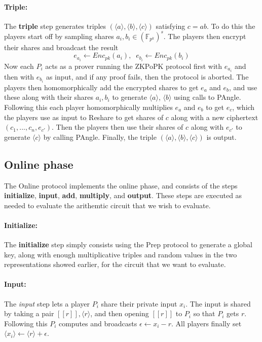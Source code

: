 \documentclass{article}
\begin{document}
\paragraph{Triple:}
The \textbf{triple} step generates triples $(\langle a \rangle, \langle b \rangle, \langle c \rangle)$ satisfying $c = ab$. To do this the players start off by sampling shares $a_i, b_i \in (\mathbb{F}_{p^k})^s$.
The players then encrypt their shares and broadcast the result $$e_{a_i} \leftarrow Enc_{pk}(a_i), \;\; e_{b_i} \leftarrow Enc_{pk}(b_i)$$
Now each $P_i$ acts as a prover running the ZKPoPK protocol first with $e_{a_i}$ and then with $e_{b_i}$ as input, and if any proof fails, then the protocol is aborted.
The players then homomorphically add the encrypted shares to get $e_a$ and $e_b$, and use these along with their shares $a_i, b_i$ to generate $\langle a \rangle$, $\langle b \rangle$ using calls to PAngle.
Following this each player homomorphically multiplies $e_a$ and $e_b$ to get $e_c$, which the players use as input to Reshare to get shares of $c$ along with a new ciphertext $(c_1, ..., c_n, e_{c'})$. Then the players then use their shares of $c$ along with $e_{c'}$ to generate $\langle c \rangle$ by calling PAngle. Finally, the triple $(\langle a \rangle, \langle b \rangle, \langle c \rangle)$ is output.


\subsection{Online phase} \label{subsection: Online}
The Online protocol implements the online phase, 
and consists of the steps \textbf{initialize}, \textbf{input}, \textbf{add}, \textbf{multiply}, and \textbf{output}. These steps are executed as needed to evaluate the arithemtic circuit that we wish to evaluate.

\paragraph{Initialize:} The \textbf{initialize} step simply consists using the Prep protocol to generate a global key, along with enough multiplicative triples and random values in the two representations showed earlier, for the circuit that we want to evaluate.

\paragraph{Input:} The \textit{input} step lets a player $P_i$ share their private input $x_i$. The input is shared by taking a pair $[\![ r ]\!], \langle r \rangle$, and then opening $[\![ r ]\!]$ to $P_i$ so that $P_i$ gets $r$. Following this $P_i$ computes and broadcasts $\epsilon \leftarrow x_i - r$. All players finally set $\langle x_i \rangle \leftarrow \langle r \rangle + \epsilon$. %
\end{document}
